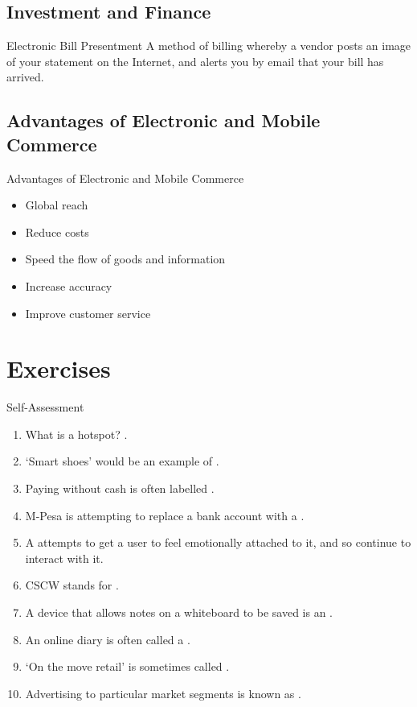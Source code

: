 \documentclass[\main/notes.tex]{subfiles}
\begin{document}
			\subsection{Investment and Finance}
				\begin{definition}{Electronic Bill Presentment}
					A method of billing whereby a vendor posts an image of your statement on the Internet, and alerts you by email that your bill has arrived.
				\end{definition}
			\subsection{Advantages of Electronic and Mobile Commerce}
				\begin{sidenote}{Advantages of Electronic and Mobile Commerce}
					\begin{itemize}[nosep]
						\item Global reach
						\item Reduce costs
						\item Speed the flow of goods and information
						\item Increase accuracy
						\item Improve customer service
					\end{itemize}
				\end{sidenote}

		\section{Exercises}
			\begin{exercise}{Self-Assessment}
				\begin{enumerate}
					\item What is a hotspot? .
					\item `Smart shoes' would be an example of .
					\item Paying without cash is often labelled .
					\item M-Pesa is attempting to replace a bank account with a .
					\item A  attempts to get a user to feel emotionally attached to it, and so continue to interact with it.
					\item CSCW stands for .
					\item A device that allows notes on a whiteboard to be saved is an .
					\item An online diary is often called a .
					\item `On the move retail' is sometimes called .
					\item Advertising to particular market segments is known as .
				\end{enumerate}
			\end{exercise}

	\vbox{}
\end{document}
